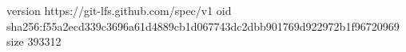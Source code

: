 version https://git-lfs.github.com/spec/v1
oid sha256:f55a2ecd339c3696a61d4889cb1d067743dc2dbb901769d922972b1f96720969
size 393312
